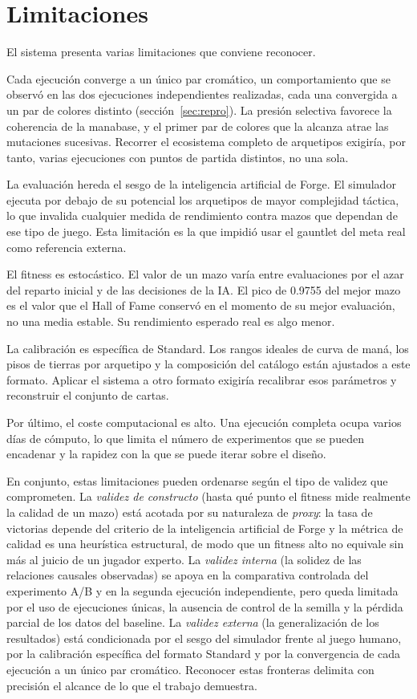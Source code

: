 \section{Limitaciones}

El sistema presenta varias limitaciones que conviene reconocer.

Cada ejecución converge a un único par cromático, un comportamiento que se observó en las dos ejecuciones independientes realizadas, cada una convergida a un par de colores distinto (sección~\ref{sec:repro}). La presión selectiva favorece la coherencia de la manabase, y el primer par de colores que la alcanza atrae las mutaciones sucesivas. Recorrer el ecosistema completo de arquetipos exigiría, por tanto, varias ejecuciones con puntos de partida distintos, no una sola.

La evaluación hereda el sesgo de la inteligencia artificial de Forge. El simulador ejecuta por debajo de su potencial los arquetipos de mayor complejidad táctica, lo que invalida cualquier medida de rendimiento contra mazos que dependan de ese tipo de juego. Esta limitación es la que impidió usar el gauntlet del meta real como referencia externa.

El fitness es estocástico. El valor de un mazo varía entre evaluaciones por el azar del reparto inicial y de las decisiones de la IA. El pico de 0.9755 del mejor mazo es el valor que el Hall of Fame conservó en el momento de su mejor evaluación, no una media estable. Su rendimiento esperado real es algo menor.

La calibración es específica de Standard. Los rangos ideales de curva de maná, los pisos de tierras por arquetipo y la composición del catálogo están ajustados a este formato. Aplicar el sistema a otro formato exigiría recalibrar esos parámetros y reconstruir el conjunto de cartas.

Por último, el coste computacional es alto. Una ejecución completa ocupa varios días de cómputo, lo que limita el número de experimentos que se pueden encadenar y la rapidez con la que se puede iterar sobre el diseño.

En conjunto, estas limitaciones pueden ordenarse según el tipo de validez que comprometen. La \emph{validez de constructo} (hasta qué punto el fitness mide realmente la calidad de un mazo) está acotada por su naturaleza de \emph{proxy}: la tasa de victorias depende del criterio de la inteligencia artificial de Forge y la métrica de calidad es una heurística estructural, de modo que un fitness alto no equivale sin más al juicio de un jugador experto. La \emph{validez interna} (la solidez de las relaciones causales observadas) se apoya en la comparativa controlada del experimento A/B y en la segunda ejecución independiente, pero queda limitada por el uso de ejecuciones únicas, la ausencia de control de la semilla y la pérdida parcial de los datos del baseline. La \emph{validez externa} (la generalización de los resultados) está condicionada por el sesgo del simulador frente al juego humano, por la calibración específica del formato Standard y por la convergencia de cada ejecución a un único par cromático. Reconocer estas fronteras delimita con precisión el alcance de lo que el trabajo demuestra.

